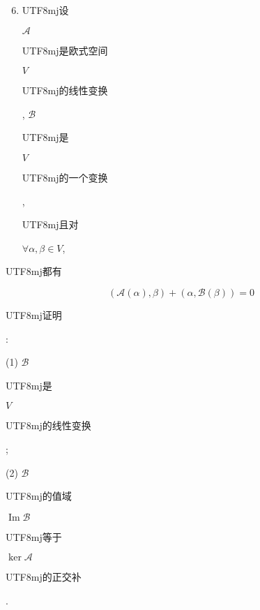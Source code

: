 \documentclass[10pt]{article}
\begin{document}
\begin{enumerate}
  \setcounter{enumi}{5}
  \item \begin{CJK}{UTF8}{mj}设\end{CJK} $\mathscr{A}$ \begin{CJK}{UTF8}{mj}是欧式空间\end{CJK} $V$ \begin{CJK}{UTF8}{mj}的线性变换\end{CJK}, $\mathscr{B}$ \begin{CJK}{UTF8}{mj}是\end{CJK} $V$ \begin{CJK}{UTF8}{mj}的一个变换\end{CJK}, \begin{CJK}{UTF8}{mj}且对\end{CJK} $\forall \alpha, \beta \in V$,
\end{enumerate}
\begin{CJK}{UTF8}{mj}都有\end{CJK}
$$
(\mathscr{A}(\alpha), \beta)+(\alpha, \mathscr{B}(\beta))=0
$$
\begin{CJK}{UTF8}{mj}证明\end{CJK}:

(1) $\mathscr{B}$ \begin{CJK}{UTF8}{mj}是\end{CJK} $V$ \begin{CJK}{UTF8}{mj}的线性变换\end{CJK};

(2) $\mathscr{B}$ \begin{CJK}{UTF8}{mj}的值域\end{CJK} $\operatorname{Im} \mathscr{B}$ \begin{CJK}{UTF8}{mj}等于\end{CJK} $\operatorname{ker} \mathscr{A}$ \begin{CJK}{UTF8}{mj}的正交补\end{CJK}.
\end{document}
